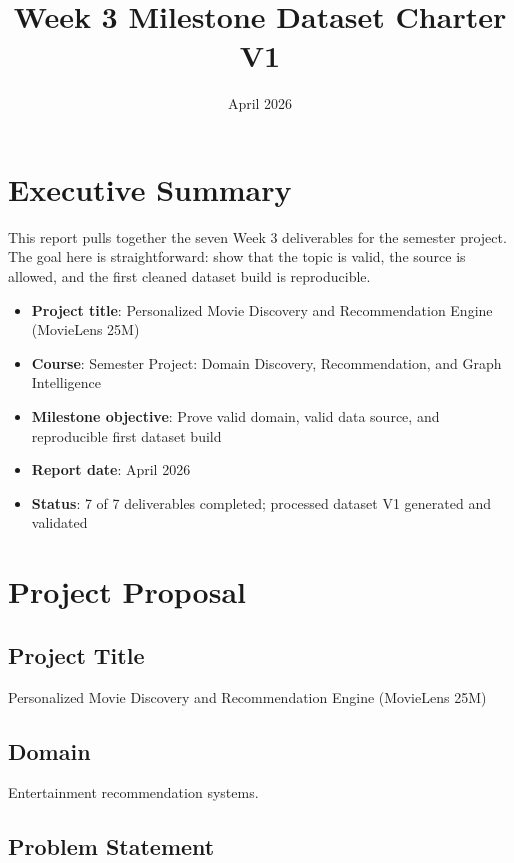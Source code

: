 \documentclass[11pt]{article}
\title{Week 3 Milestone Dataset Charter V1}
\date{April 2026}
\begin{document}
\maketitle

\section{Executive Summary}

This report pulls together the seven Week 3 deliverables for the semester project. The goal here is straightforward: show that the topic is valid, the source is allowed, and the first cleaned dataset build is reproducible.

\begin{itemize}[leftmargin=1.5em]
    \item \textbf{Project title}: Personalized Movie Discovery and Recommendation Engine (MovieLens 25M)
    \item \textbf{Course}: Semester Project: Domain Discovery, Recommendation, and Graph Intelligence
    \item \textbf{Milestone objective}: Prove valid domain, valid data source, and reproducible first dataset build
    \item \textbf{Report date}: April 2026
    \item \textbf{Status}: 7 of 7 deliverables completed; processed dataset V1 generated and validated
\end{itemize}

\section{Project Proposal}

\subsection{Project Title}

Personalized Movie Discovery and Recommendation Engine (MovieLens 25M)

\subsection{Domain}

Entertainment recommendation systems.

\subsection{Problem Statement}
\end{document}
